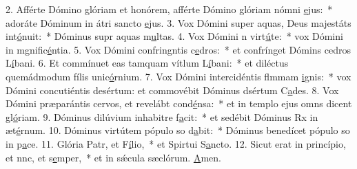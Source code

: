 2. Afférte Dómino glóriam et honórem, afférte Dómino glóriam nómni \uline{e}jus:~* adoráte Dóminum in átri sancto \uline{e}jus.
3. Vox Dómini super aquas, Deus majestáts int\uline{ó}nuit:~* Dóminus supr aquas m\uline{u}ltas.
4. Vox Dómini n virt\uline{ú}te:~* vox Dómini in mgnific\uline{é}ntia.
5. Vox Dómini confringntis c\uline{e}dros:~* et confrínget Dómins cedros L\uline{í}bani.
6. Et commínuet eas tamquam vítlum L\uline{í}bani:~* et diléctus quemádmodum fílis unic\uline{ó}rnium.
7. Vox Dómini intercidéntis flmmam \uline{i}gnis:~* vox Dómini concutiéntis desértum: et commovébit Dóminus dsértum C\uline{a}des.
8. Vox Dómini præparántis cervos, et revelábt cond\uline{é}nsa:~* et in templo ejus omns dicent gl\uline{ó}riam.
9. Dóminus dilúvium inhabitre f\uline{a}cit:~* et sedébit Dóminus Rx in æt\uline{é}rnum.
10. Dóminus virtútem pópulo so d\uline{a}bit:~* Dóminus benedícet pópulo so in p\uline{a}ce.
11. Glória Patr, et F\uline{í}lio,~* et Spirtui S\uline{a}ncto.
12. Sicut erat in princípio, et nnc, et s\uline{e}mper,~* et in sǽcula sæclórum. \uline{A}men.

